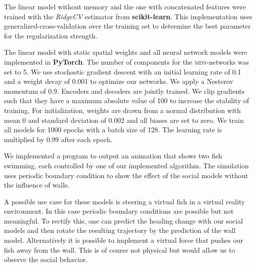 \documentclass[nobib, a4paper]{tufte-handout}
\begin{document}
The linear model without memory and the one with concatenated features were trained with the \textit{RidgeCV} estimator from \textbf{scikit-learn}\autocite{scikitLearn}.
This implementation uses generalized-cross-validation over the training set to determine the best parameter for the regularization strength.

The linear model with static spatial weights and all neural network models were implemented in \textbf{PyTorch}.
The number of components for the \textsc{mdn}-networks was set to 5.
We use stochastic gradient descent with an initial learning rate of 0.1 and a weight decay of 0.001 to optimize our networks.
We apply a Nesterov momentum of 0.9.
Encoders and decoders are jointly trained.
We clip gradients such that they have a maximum absolute value of 100 to increase the stability of training.
For initialization, weights are drawn from a normal distribution with mean 0 and standard deviation of 0.002 and all biases are set to zero.
We train all models for 1000 epochs with a batch size of 128.
The learning rate is multiplied by 0.99 after each epoch.

We implemented a program to output an animation that shows two fish swimming, each controlled by one of our implemented algorithm.
The simulation uses periodic boundary condition to show the effect of the social models without the influence of walls.

A possible use case for these models is steering a virtual fish in a virtual reality environment\autocite{animalVr}.
In this case periodic boundary conditions are possible but not meaningful.
To rectify this, one can predict the heading change with our social models and then rotate the resulting trajectory by the prediction of the wall model.
Alternatively it is possible to implement a virtual force that pushes our fish away from the wall.
This is of course not physical but would allow us to observe the social behavior.
\end{document}
